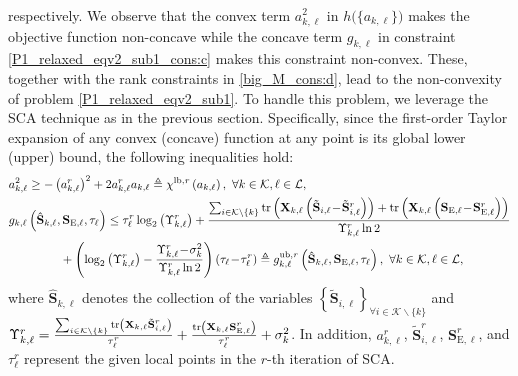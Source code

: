 \documentclass[12pt,draftclsnofoot, onecolumn]{IEEEtran}
\theoremstyle{plain}
\begin{document}
\begin{sloppypar}
\begin{align}
\end{align}
respectively. We observe that the convex term $a_{k,\ell}^2$ in $h\big(\{a_{k,\ell}\}\big)$ makes the objective function non-concave while the concave term $g_{k,\ell}$ in constraint \eqref{P1_relaxed_eqv2_sub1_cons:c} makes this constraint non-convex. These, together with the rank constraints in \eqref{big_M_cons:d}, lead to the non-convexity of problem \eqref{P1_relaxed_eqv2_sub1}. To handle this problem, we leverage the SCA technique as in the previous section. Specifically, since the first-order Taylor expansion of any convex (concave) function at any point is its global lower (upper) bound, the following inequalities hold:
\begin{align}
& a_{k,\ell}^2 \geq -\left( a_{k,\ell}^r\right)^2 + 2a_{k,\ell}^ra_{k,\ell} \triangleq \chi^{\rm lb, \it r}\left(a_{k,\ell}\right), \ \forall k\in\mathcal K, \ell\in\mathcal L, \label{express_a_lower}\\ 
& g_{k,\ell}\left(\hat{\mathbf S}_{k,\ell}, \mathbf S_{\mathrm E, \ell}, \tau_\ell\right)  \leq \tau_\ell^r\log_2\left(\Upsilon_{k,\ell}^r\right) + \frac{\sum_{i\in \mathcal K\backslash\{k\}}{\rm tr}\left(\mathbf X_{k,\ell}\left( \tilde{\mathbf S}_{i,\ell} \!-\! \tilde{\mathbf S}_{i,\ell}^r\right)\right) + {\rm tr}\left(\mathbf X_{k,\ell}\left( \mathbf S_{\mathrm E,\ell} \!-\! \mathbf S_{\mathrm E,\ell}^r\right) \right)}{\Upsilon_{k,\ell}^r\ln2} \nonumber\\
& \hspace{1.5cm} + \left(\log_2\left(\Upsilon_{k,\ell}^r\right) - \frac{\Upsilon_{k,\ell}^r \!-\! \sigma_k^2 }{\Upsilon_{k,\ell}^r\ln2}\right)\left(\tau_\ell \!-\! \tau_\ell^r\right) \triangleq g_{k,\ell}^{\rm ub, \it r}\left(\hat{\mathbf S}_{k,\ell}, \mathbf S_{\mathrm E, \ell}, \tau_\ell\right), \ \forall k\in\mathcal K, \ell\in\mathcal L, \label{express_g_upper}
\end{align}
where $\hat{\mathbf S}_{k,\ell}$ denotes the collection of the variables $\left\lbrace \tilde{\mathbf S}_{i,\ell}\right\rbrace_{\forall i\in\mathcal K\backslash\{k\}}$ and $\Upsilon_{k,\ell}^r = \frac{\sum_{i\in \mathcal K\backslash\{k\}}{\rm tr}\left(\mathbf X_{k,\ell}\tilde{\mathbf S}_{i,\ell}^r\right)}{\tau_\ell^r} + \frac{{\rm tr}\left(\mathbf X_{k,\ell}\mathbf S_{\mathrm E,\ell}^r\right)}{\tau_\ell^r} + \sigma_k^2$. In addition, $a_{k,\ell}^r$, $\tilde{\mathbf S}_{i,\ell}^r$, $\mathbf S_{\mathrm E,\ell}^r$, and $\tau_\ell^r$ represent the given local points in the $r$-th iteration of SCA. %


\end{sloppypar}
\end{document}
